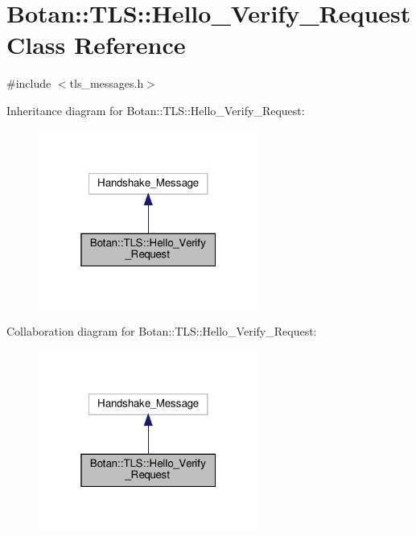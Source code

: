 \hypertarget{class_botan_1_1_t_l_s_1_1_hello___verify___request}{}\section{Botan\+:\+:T\+LS\+:\+:Hello\+\_\+\+Verify\+\_\+\+Request Class Reference}
\label{class_botan_1_1_t_l_s_1_1_hello___verify___request}


{\ttfamily \#include $<$tls\+\_\+messages.\+h$>$}



Inheritance diagram for Botan\+:\+:T\+LS\+:\+:Hello\+\_\+\+Verify\+\_\+\+Request\+:
\nopagebreak
\begin{figure}[H]
\begin{center}
\leavevmode
\includegraphics[width=205pt]{class_botan_1_1_t_l_s_1_1_hello___verify___request__inherit__graph}
\end{center}
\end{figure}


Collaboration diagram for Botan\+:\+:T\+LS\+:\+:Hello\+\_\+\+Verify\+\_\+\+Request\+:
\nopagebreak
\begin{figure}[H]
\begin{center}
\leavevmode
\includegraphics[width=205pt]{class_botan_1_1_t_l_s_1_1_hello___verify___request__coll__graph}
\end{center}
\end{figure}
